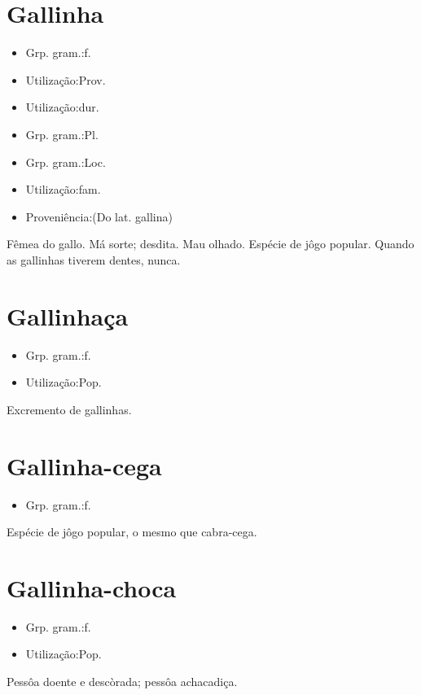 \section{Gallinha}
\begin{itemize}
\item {Grp. gram.:f.}
\end{itemize}
\begin{itemize}
\item {Utilização:Prov.}
\end{itemize}
\begin{itemize}
\item {Utilização:dur.}
\end{itemize}
\begin{itemize}
\item {Grp. gram.:Pl.}
\end{itemize}
\begin{itemize}
\item {Grp. gram.:Loc.}
\end{itemize}
\begin{itemize}
\item {Utilização:fam.}
\end{itemize}
\begin{itemize}
\item {Proveniência:(Do lat. \textunderscore gallina\textunderscore )}
\end{itemize}
Fêmea do gallo.
Má sorte; desdita.
Mau olhado.
Espécie de jôgo popular.
\textunderscore Quando as gallinhas tiverem dentes\textunderscore , nunca.
\section{Gallinhaça}
\begin{itemize}
\item {Grp. gram.:f.}
\end{itemize}
\begin{itemize}
\item {Utilização:Pop.}
\end{itemize}
Excremento de gallinhas.
\section{Gallinha-cega}
\begin{itemize}
\item {Grp. gram.:f.}
\end{itemize}
Espécie de jôgo popular, o mesmo que \textunderscore cabra-cega\textunderscore .
\section{Gallinha-choca}
\begin{itemize}
\item {Grp. gram.:f.}
\end{itemize}
\begin{itemize}
\item {Utilização:Pop.}
\end{itemize}
Pessôa doente e descòrada; pessôa achacadiça.

